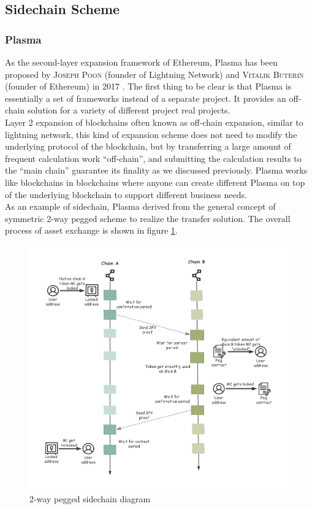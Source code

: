 \subsection{Sidechain Scheme}
\label{sec:side}


\subsubsection{Plasma}
\noindent As the second-layer expansion framework of Ethereum, Plasma has been proposed by \textsc{Joseph Poon} (founder of Lightning Network) and \textsc{Vitalik Buterin} (founder of Ethereum) in 2017 \cite{poon2017plasma}. The first thing to be clear is that Plasma is essentially a set of frameworks instead of a separate project. It provides an off-chain solution for a variety of different project real projects. \\
\noindent Layer 2 expansion of blockchains often known as off-chain expansion, similar to lightning network, this kind of expansion scheme does not need to modify the underlying protocol of the blockchain, but by transferring a large amount of frequent calculation work ``off-chain'', and submitting the calculation results to the ``main chain'' guarantee its finality as we discussed previously. Plasma works like blockchains in blockchains where anyone can create different Plasma on top of the underlying blockchain to support different business needs. \\
\noindent As an example of sidechain, Plasma derived from the general concept of symmetric 2-way pegged scheme to realize the transfer solution. The overall process of asset exchange is shown in figure \ref{fig:2way}. 
        \begin{figure}[H]
        \includegraphics[width=1\textwidth]{./figures/2way.png}
        \centering
        \caption{{2-way pegged sidechain diagram}\protect\footnotemark}
        \centering
        \label{fig:2way}
        
        \end{figure}
